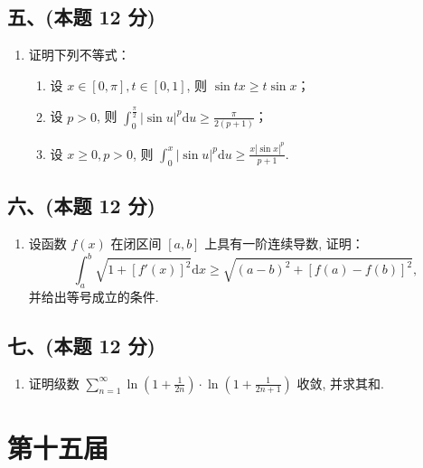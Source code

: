 \subsection*{五、(本题 12 分)}
\begin{enumerate}[start=9]
    \item 证明下列不等式：
          \begin{enumerate}
              \item[(1)] 设 $x \in [0, \pi], t \in [0, 1]$, 则 $\sin tx \geqslant t \sin x$；
              \item[(2)] 设 $p > 0$, 则 $\displaystyle\int_{0}^{\frac{\pi}{2}} |\sin u|^p \mathrm{d}u \geqslant \frac{\pi}{2(p + 1)}$；
              \item[(3)] 设 $x \geqslant 0, p > 0$, 则 $\displaystyle\int_{0}^{x} |\sin u|^p \mathrm{d}u \geqslant \frac{x |\sin x|^p}{p + 1}$.
          \end{enumerate}
\end{enumerate}

\subsection*{六、(本题 12 分)}
\begin{enumerate}[start=10]
    \item 设函数 $f(x)$ 在闭区间 $[a, b]$ 上具有一阶连续导数, 证明：
          \[
              \int_{a}^{b} \sqrt{1 + [f'(x)]^2} \mathrm{d}x \geqslant \sqrt{(a - b)^2 + [f(a) - f(b)]^2},
          \]
          并给出等号成立的条件.
\end{enumerate}

\subsection*{七、(本题 12 分)}
\begin{enumerate}[start=11]
    \item 证明级数 $\displaystyle\sum_{n=1}^{\infty} \ln \left( 1 + \frac{1}{2n} \right) \cdot \ln \left( 1 + \frac{1}{2n+1} \right)$ 收敛, 并求其和.
\end{enumerate}


\newpage
\section{第十五届}

